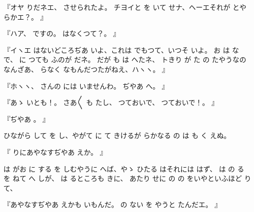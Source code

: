 『オヤ
りだネエ、
させられたよ。
チヨイと
を
いて
せナ、ヘーエそれが
とやらかエ？。
』

『ハア、
ですの。
はなくつて？。
』

『イヽエ
はないどころぢあ
いよ、これは
でもつて、いつそ
いよ。
お
は
な
で、
に
つても
ふのが
だネ。
だが
も
は
へたネ、
トきり
が
た
の
たやうなのなんざあ、
らなく
なもんだつたがねえ、ハヽヽ。
』

『ホヽヽ、
さんの
には
いませんわ。
ぢやあ
へ。
』

『あゝ
いとも！。
さあ〳〵
も
たし、
つておいで、
つておいで！。
』

『ぢやあ
。
』

ひながら
して
を
し、やがて
に
て
きけるが
らかなる
の
は
も
く
えぬ。

『
りにあやなすぢやあ
えか。
』

は
がお
に
する
を
しむやうに
へば、やゝ
ひたる
はそれには
はず、
は
の
る
を
ねて
へ
しが、
は
るところも
きに、
あたり
せに
の
の
をいやといふほど
りて、

『あやなすぢやあ
えかも
いもんだ。
の
ない
を
やうと
たんだエ。
』

